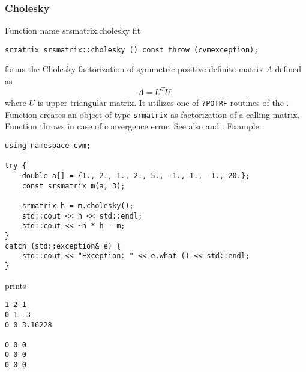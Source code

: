 \subsubsection{Cholesky}
Function%
\pdfdest name {srsmatrix.cholesky} fit
\begin{verbatim}
srmatrix srsmatrix::cholesky () const throw (cvmexception);
\end{verbatim}
forms the Cholesky factorization of  symmetric positive-definite 
matrix $A$ defined as
\begin{equation*}
A=U^T U,
\end{equation*}
where $U$ is upper triangular matrix.
It utilizes one of \verb"?POTRF" routines of the
.
Function
creates an object of type \verb"srmatrix" as 
 factorization of a calling matrix.
Function
throws 
in case of convergence error.
See also
 and
.
Example:
\begin{Verbatim}
using namespace cvm;

try {
    double a[] = {1., 2., 1., 2., 5., -1., 1., -1., 20.};
    const srsmatrix m(a, 3);
    
    srmatrix h = m.cholesky();
    std::cout << h << std::endl;
    std::cout << ~h * h - m;
}
catch (std::exception& e) {
    std::cout << "Exception: " << e.what () << std::endl;
}
\end{Verbatim}
prints
\begin{Verbatim}
1 2 1
0 1 -3
0 0 3.16228

0 0 0
0 0 0
0 0 0
\end{Verbatim}
\newpage



